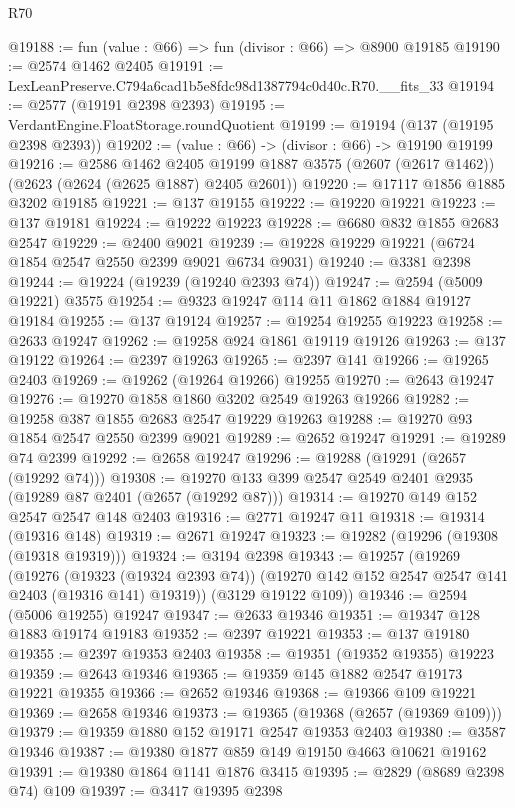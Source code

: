 \begin{lexlean}{R70}
\begin{coremodule}
@19188 := fun (value : @66) => fun (divisor : @66) => @8900 @19185
@19190 := @2574 @1462 @2405
@19191 := LexLeanPreserve.C794a6cad1b5e8fdc98d1387794c0d40c.R70.__fits_33
@19194 := @2577 (@19191 @2398 @2393)
@19195 := VerdantEngine.FloatStorage.roundQuotient
@19199 := @19194 (@137 (@19195 @2398 @2393))
@19202 := (value : @66) -> (divisor : @66) -> @19190 @19199
@19216 := @2586
    @1462
    @2405
    @19199
    @1887
    @3575
    (@2607 (@2617 @1462))
    (@2623 (@2624 (@2625 @1887) @2405 @2601))
@19220 := @17117 @1856 @1885 @3202 @19185
@19221 := @137 @19155
@19222 := @19220 @19221
@19223 := @137 @19181
@19224 := @19222 @19223
@19228 := @6680 @832 @1855 @2683 @2547
@19229 := @2400 @9021
@19239 := @19228 @19229 @19221 (@6724 @1854 @2547 @2550 @2399 @9021 @6734 @9031)
@19240 := @3381 @2398
@19244 := @19224 (@19239 (@19240 @2393 @74))
@19247 := @2594 (@5009 @19221) @3575
@19254 := @9323 @19247 @114 @11 @1862 @1884 @19127 @19184
@19255 := @137 @19124
@19257 := @19254 @19255 @19223
@19258 := @2633 @19247
@19262 := @19258 @924 @1861 @19119 @19126
@19263 := @137 @19122
@19264 := @2397 @19263
@19265 := @2397 @141
@19266 := @19265 @2403
@19269 := @19262 (@19264 @19266) @19255
@19270 := @2643 @19247
@19276 := @19270 @1858 @1860 @3202 @2549 @19263 @19266
@19282 := @19258 @387 @1855 @2683 @2547 @19229 @19263
@19288 := @19270 @93 @1854 @2547 @2550 @2399 @9021
@19289 := @2652 @19247
@19291 := @19289 @74 @2399
@19292 := @2658 @19247
@19296 := @19288 (@19291 (@2657 (@19292 @74)))
@19308 := @19270 @133 @399 @2547 @2549 @2401 @2935 (@19289 @87 @2401 (@2657 (@19292 @87)))
@19314 := @19270 @149 @152 @2547 @2547 @148 @2403
@19316 := @2771 @19247 @11
@19318 := @19314 (@19316 @148)
@19319 := @2671 @19247
@19323 := @19282 (@19296 (@19308 (@19318 @19319)))
@19324 := @3194 @2398
@19343 := @19257
    (@19269
      (@19276
        (@19323 (@19324 @2393 @74))
        (@19270 @142 @152 @2547 @2547 @141 @2403 (@19316 @141) @19319))
      (@3129 @19122 @109))
@19346 := @2594 (@5006 @19255) @19247
@19347 := @2633 @19346
@19351 := @19347 @128 @1883 @19174 @19183
@19352 := @2397 @19221
@19353 := @137 @19180
@19355 := @2397 @19353 @2403
@19358 := @19351 (@19352 @19355) @19223
@19359 := @2643 @19346
@19365 := @19359 @145 @1882 @2547 @19173 @19221 @19355
@19366 := @2652 @19346
@19368 := @19366 @109 @19221
@19369 := @2658 @19346
@19373 := @19365 (@19368 (@2657 (@19369 @109)))
@19379 := @19359 @1880 @152 @19171 @2547 @19353 @2403
@19380 := @3587 @19346
@19387 := @19380 @1877 @859 @149 @19150 @4663 @10621 @19162
@19391 := @19380 @1864 @1141 @1876 @3415
@19395 := @2829 (@8689 @2398 @74) @109
@19397 := @3417 @19395 @2398

\end{coremodule}
\end{lexlean}
